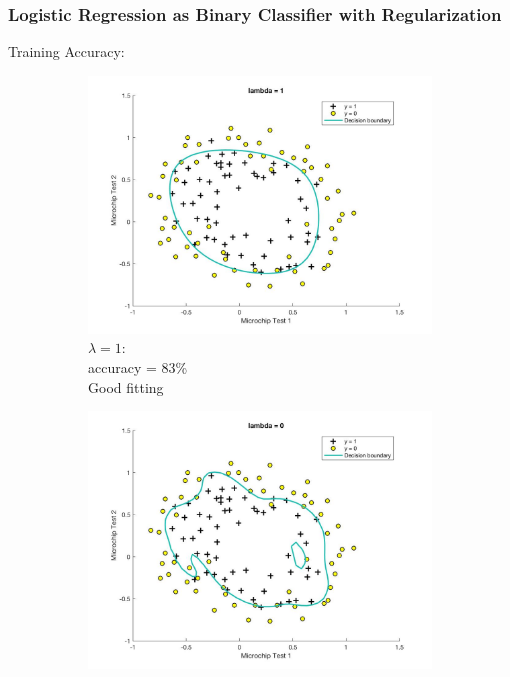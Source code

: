 \begin{frame}
\frametitle{Logistic Regression as Binary Classifier with Regularization}

Training Accuracy: \newline\newline

\begin{figure}[h!]

\begin{subfigure}{.3\textwidth}
  \centering
  \includegraphics[scale = 0.1]{pictures/4_plotData2_lambda_1}
  \caption{$\lambda=1$:\\ accuracy = 83\% \\ Good fitting}
  \label{fig:sub1}
\end{subfigure}
\begin{subfigure}{.3\textwidth}
  \centering
  \includegraphics[scale = 0.1]{pictures/5_plotData2_lambda_0_overfitting}

\end{subfigure}
\end{figure}
\end{frame}
